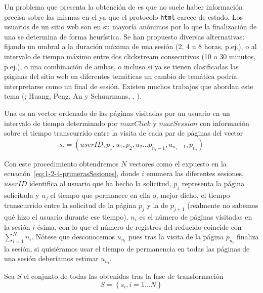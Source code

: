 Un problema que presenta la obtención de \sns es que no suele haber información precisa sobre las mismas en el \flog ya que el protocolo \texttt{html} carece de estado. Los usuarios de un sitio web son en su mayoría anónimos por lo que la finalización de una \sn se determina de forma heurística. Se han propuesto diversas alternativas: fijando un umbral a la duración máxima de una sesión (2, 4 u 8 horas, p.ej.), o al intervalo de tiempo máximo entre dos clickstream consecutivos (10 o 30 minutos, p.ej.), o una combinación de ambas, o incluso si ya se tienen clasificadas las páginas del sitio web en diferentes temáticas un cambio de temática podría interpretarse como un final de sesión. Existen muchos trabajos que abordan este tema (\cite{HeGoker_DetectingSessionBoundaries_2000,HuangPengAnSchuurmansCercone_SessionBoundaryDetection_2003}; Huang, Peng, An y Schuurmans, \cite*{Huang:Peng:An:Schuurmans:DynamicWebLogSessionBoundaryDetection:2004}, \cite*{Huang:Peng:An:Schuurmans:DynamicWebLogSessionIdentification:2004}).

\begin{Definition}[\Sn]\label{def:1-2-4-sesion}
  Una \sn es un vector ordenado de las páginas visitadas por un usuario en un intervalo de tiempo determinado por $maxClick$ y $maxSession$ con información sobre el tiempo transcurrido entre la visita de cada par de páginas del vector
  \begin{equation}\label{eq:1-2-4-primerasSesiones}
    s_i = \left({userID}, p_1, u_1, p_2, u_2\ldots p_{n_i-1}, u_{n_i-1}, p_{n_i}\right)
  \end{equation}
\end{Definition}

Con este procedimiento obtendremos $N$ vectores como el expuesto en la ecuación~\ref{eq:1-2-4-primerasSesiones}, donde $i$ enumera las diferentes sesiones, $userID$ identifica al usuario que ha hecho la solicitud, $p_j$ representa la página solicitada y $u_j$ el tiempo que permanece en ella o, mejor dicho, el tiempo transcurrido entre la solicitud de la página $p_j$ y la de $p_{j+1}$ (realmente no sabemos qué hizo el usuario durante ese tiempo). $n_i$ es el número de páginas visitadas en la sesión $i$-ésima, con lo que el número de registros del \flog reducido coincide con $\sum_{i=1}^N{n_i}$. Nótese que desconocemos $u_{n_i}$ pues tras la visita de la página $p_{n_i}$ finaliza la sesión, si quisiéramos usar el tiempo de permanencia en todas las páginas de una sesión deberíamos estimar $u_{n_i}$.

\begin{Definition}\label{def:1-2-4-cjto-sesion}
  Sea $S$ el conjunto de todas las \sns obtenidas tras la fase de transformación
  \begin{equation}\label{eq:1-2-4-cjto-sesiones}
    S = \left\{s_i, i = 1\ldots N\right\}
  \end{equation}
\end{Definition}


